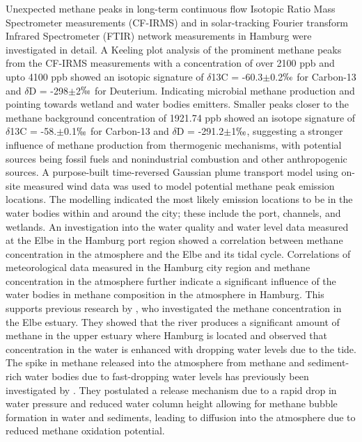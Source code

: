 
Unexpected methane peaks in long-term continuous flow Isotopic Ratio Mass Spectrometer measurements (CF-IRMS) and in solar-tracking Fourier transform Infrared Spectrometer (FTIR) network measurements in Hamburg were investigated in detail.
A Keeling plot analysis of the prominent methane peaks from the CF-IRMS measurements with a concentration of over 2100 ppb and upto 4100 ppb showed an isotopic signature of $\delta$13C = -60.3$\pm $0.2$ \permil$ for Carbon-13 and $\delta$D = -298$\pm $2$ \permil$ for Deuterium. Indicating microbial methane production and pointing towards wetland and water bodies emitters.
Smaller peaks closer to the methane background concentration of 1921.74 ppb showed an isotope signature of $\delta$13C = -58.$\pm $0.1$ \permil$ for Carbon-13 and $\delta$D = -291.2$\pm $1$ \permil$, suggesting a stronger influence of methane production from thermogenic mechanisms, with potential sources being fossil fuels and nonindustrial combustion and other anthropogenic sources.
A purpose-built time-reversed Gaussian plume transport model using on-site measured wind data was used to model potential methane peak emission locations. The modelling indicated the most likely emission locations to be in the water bodies within and around the city; these include the port, channels, and wetlands.
An investigation into the water quality and water level data measured at the Elbe in the Hamburg port region showed a correlation between methane concentration in the atmosphere and the Elbe and its tidal cycle.
Correlations of meteorological data measured in the Hamburg city region and methane concentration in the atmosphere further indicate a significant influence of the water bodies in methane composition in the atmosphere in Hamburg.
This supports previous research by \cite{Matousu.2017}, who investigated the methane concentration in the Elbe estuary. They showed that the river produces a significant amount of methane in the upper estuary where Hamburg is located and observed that concentration in the water is enhanced with dropping  water levels due to the tide.
The spike in methane released into the atmosphere from methane and sediment-rich water bodies due to fast-dropping water levels has previously been investigated by \cite{Harrison.2017}. They postulated a release mechanism due to a rapid drop in water pressure and reduced water column height allowing for methane bubble formation in water and sediments, leading to diffusion into the atmosphere due to reduced methane oxidation potential. 
